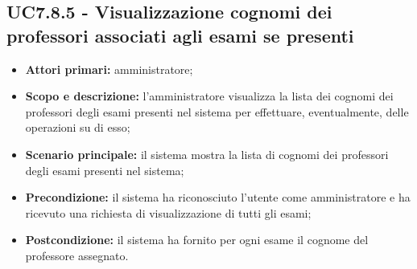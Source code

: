 \documentclass[AnalisiDeiRequisiti.tex]{subfiles}
\begin{document}
\subsection{UC7.8.5 - Visualizzazione cognomi dei professori associati agli esami se presenti}
\begin{itemize}
	\item \textbf{Attori primari:} amministratore;
	\item \textbf{Scopo e descrizione:} l'amministratore visualizza la lista dei cognomi dei professori degli esami presenti nel sistema per effettuare, eventualmente, delle operazioni su di esso;
	\item \textbf{Scenario principale:} il sistema mostra la lista di cognomi dei professori degli esami presenti nel sistema;
	\item \textbf{Precondizione:} il sistema ha riconosciuto l'utente come amministratore e ha ricevuto una richiesta di visualizzazione di tutti gli esami; 
	\item \textbf{Postcondizione:} il sistema ha fornito per ogni esame il cognome del professore assegnato.
\end{itemize}
\end{document}
